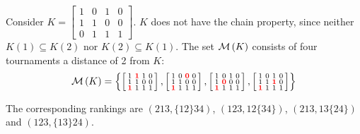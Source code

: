 \begin{example}
    \label{tourn_ex_minch}
    Consider
    $
        K = \left[\begin{smallmatrix}
            1 & 0 & 1 & 0 \\
            1 & 1 & 0 & 0 \\
            0 & 1 & 1 & 1
        \end{smallmatrix}\right]
    $.
    $K$ does not have the chain property, since neither $K(1) \subseteq K(2)$
    nor $K(2) \subseteq K(1)$. The set $\operatorname{\mathcal{M}}\left({K}\right)$ consists of four
    tournaments a distance of 2 from $K$:
    \[
        \operatorname{\mathcal{M}}\left({K}\right) = \left\{
            \left[\begin{smallmatrix}
                1 & \bm{{\color{red}1}} & 1 & 0 \\
                1 & 1 & 0 & 0 \\
                \bm{{\color{red}1}} & 1 & 1 & 1
            \end{smallmatrix}\right],
            \left[\begin{smallmatrix}
                1 & 0 & \bm{{\color{red}0}} & 0 \\
                1 & 1 & 0 & 0 \\
                \bm{{\color{red}1}} & 1 & 1 & 1
            \end{smallmatrix}\right],
            \left[\begin{smallmatrix}
                1 & 0 & 1 & 0 \\
                1 & \bm{{\color{red}0}} & 0 & 0 \\
                \bm{{\color{red}1}} & 1 & 1 & 1
            \end{smallmatrix}\right],
            \left[\begin{smallmatrix}
                1 & 0 & 1 & 0 \\
                1 & 1 & \bm{{\color{red}1}} & 0 \\
                \bm{{\color{red}1}} & 1 & 1 & 1
            \end{smallmatrix}\right]
        \right\}
    \]

    \sloppy
    The corresponding rankings are $(213, \{12\}34)$, $(123, 12\{34\})$, $(213,
    13\{24\})$ and $(123, \{13\}24)$.\footnotemark{}



\end{example}

